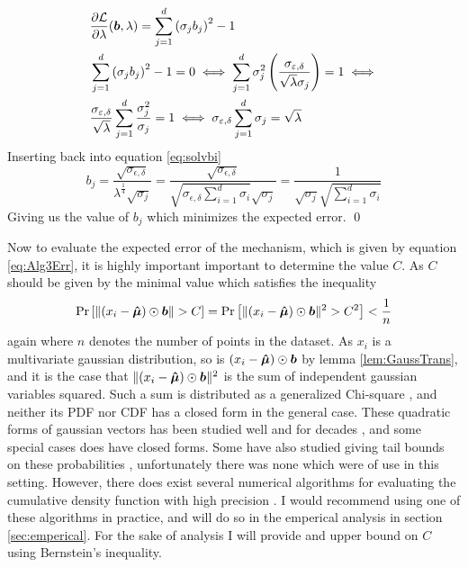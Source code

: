 \documentclass[a4paper,12pt]{article}
\renewenvironment{proof}{{\textit{Proof} \\}}{\qed}
\begin{document}
\begin{proof}
\begin{align*}
    &\frac{\partial \mathcal{L}}{\partial \lambda}(\bm{b},\lambda) = 
    \sum_{j=1}^d \left ( \sigma_j b_j\right)^2 - 1 \\
    &\sum_{j=1}^d \left ( \sigma_j b_j\right)^2 - 1 = 0 \iff
    \sum_{j=1}^d \sigma_j^2 \left (\frac{\sigma_{\varepsilon,\delta}}{\sqrt{\lambda}\sigma_j}\right) = 1 \iff \\
    &\frac{\sigma_{\varepsilon,\delta}}{\sqrt{\lambda}} \sum_{j=1}^d \frac{\sigma_j^2}{\sigma_j} = 1 \iff
    \sigma_{\varepsilon,\delta} \sum_{j=1}^d \sigma_j = \sqrt{\lambda}
\end{align*}
Inserting back into equation \eqref{eq:solvbi}
\[
    b_j = \frac{\sqrt{\sigma_{\epsilon,\delta}}}{\lambda^{\frac{1}{4}} \sqrt{\sigma_j}} =
    \frac{\sqrt{\sigma_{\epsilon,\delta}}}{\sqrt{\sigma_{\epsilon,\delta} \sum_{i=1}^d \sigma_i} \sqrt{\sigma_j}} = 
    \frac{1}{\sqrt{\sigma_j} \sqrt{\sum_{i=1}^d \sigma_i} } 
\]
Giving us the value of $b_j$ which minimizes the expected error.
\end{proof}

Now to evaluate the expected error of the mechanism, which is given by equation \eqref{eq:Alg3Err}, it is highly important important to determine the value $C$.
As $C$ should be given by the minimal value which satisfies the inequality
\[
   \Pr\left [ \| (x_i - \bm{\hat{\mu}}) \odot \bm{b} \| > C  \right] = \Pr\left [ \| (x_i - \bm{\hat{\mu}}) \odot \bm{b} \|^2 > C^2 \right] < \frac{1}{n}
\]
again where $n$ denotes the number of points in the dataset.
As $x_i$ is a multivariate gaussian distribution, so is $(x_i - \bm{\hat{\mu}}) \odot \bm{b}$ by lemma \ref{lem:GaussTrans},
and it is the case that $\|(x_i - \bm{\hat{\mu}}) \odot \bm{b}\|^2$ is the sum of independent gaussian variables squared.
Such a sum is distributed as a generalized Chi-square \cite{GenChiSq}, and neither its PDF nor CDF has a closed form in the general case.
These quadratic forms of gaussian vectors has been studied well and for decades \cite{MathaiQaudForms}, and some special cases does have closed forms.
Some have also studied giving tail bounds on these probabilities \cite{QaudFormsBounds}, unfortunately there was none which were of use in this setting.
However, there does exist several numerical algorithms for evaluating the cumulative density function with high precision \cite{QuadFormsNume}. 
I would recommend using one of these algorithms in practice, and will do so in the emperical analysis in section \ref{sec:emperical}.
For the sake of analysis I will provide and upper bound on $C$ using Bernstein's inequality.
\end{document}
